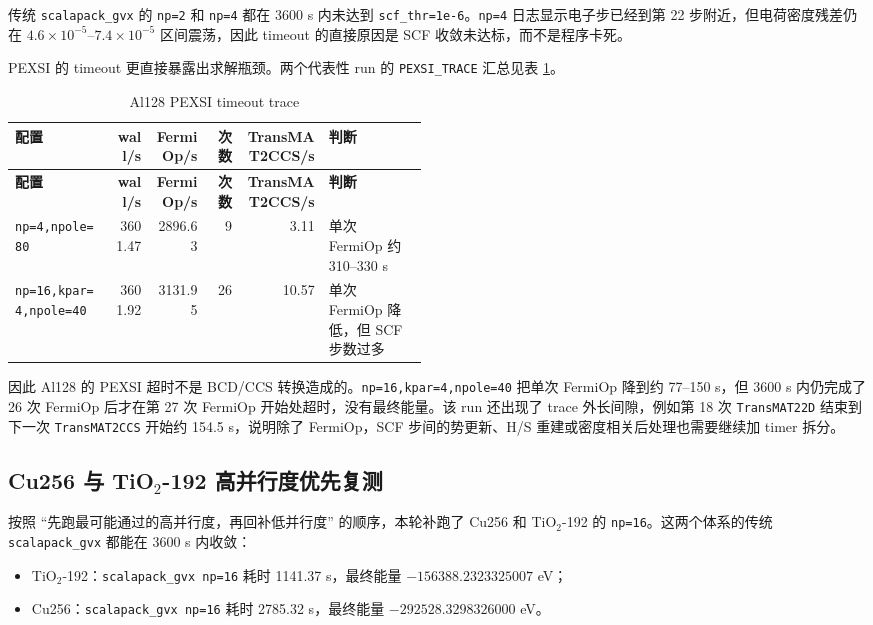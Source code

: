 \documentclass[a4paper,11pt]{article}
\newcommand{\code}[1]{\texttt{#1}}
\begin{document}
传统 \code{scalapack\_gvx} 的 \code{np=2} 和 \code{np=4} 都在 3600 s 内未达到 \code{scf\_thr=1e-6}。\code{np=4} 日志显示电子步已经到第 22 步附近，但电荷密度残差仍在 \(4.6\times10^{-5}\)--\(7.4\times10^{-5}\) 区间震荡，因此 timeout 的直接原因是 SCF 收敛未达标，而不是程序卡死。

PEXSI 的 timeout 更直接暴露出求解瓶颈。两个代表性 run 的 \code{PEXSI\_TRACE} 汇总见表 \ref{tab:al-trace}。

{\scriptsize
\begin{longtable}{@{}p{0.24\linewidth}r r r r p{0.24\linewidth}@{}}
\caption{Al128 PEXSI timeout trace}
\label{tab:al-trace}\\
\toprule
\textbf{配置} & \textbf{wall/s} & \textbf{FermiOp/s} & \textbf{次数} & \textbf{TransMAT2CCS/s} & \textbf{判断}\\
\midrule
\endfirsthead
\toprule
\textbf{配置} & \textbf{wall/s} & \textbf{FermiOp/s} & \textbf{次数} & \textbf{TransMAT2CCS/s} & \textbf{判断}\\
\midrule
\endhead
\code{np=4,npole=80} & 3601.47 & 2896.63 & 9 & 3.11 & 单次 FermiOp 约 310--330 s\\
\code{np=16,kpar=4,npole=40} & 3601.92 & 3131.95 & 26 & 10.57 & 单次 FermiOp 降低，但 SCF 步数过多\\
\bottomrule
\end{longtable}
}

因此 Al128 的 PEXSI 超时不是 BCD/CCS 转换造成的。\code{np=16,kpar=4,npole=40} 把单次 FermiOp 降到约 77--150 s，但 3600 s 内仍完成了 26 次 FermiOp 后才在第 27 次 FermiOp 开始处超时，没有最终能量。该 run 还出现了 trace 外长间隙，例如第 18 次 \code{TransMAT22D} 结束到下一次 \code{TransMAT2CCS} 开始约 154.5 s，说明除了 FermiOp，SCF 步间的势更新、H/S 重建或密度相关后处理也需要继续加 timer 拆分。

\subsection{Cu256 与 TiO\(_2\)-192 高并行度优先复测}

按照 ``先跑最可能通过的高并行度，再回补低并行度'' 的顺序，本轮补跑了 Cu256 和 TiO\(_2\)-192 的 \code{np=16}。这两个体系的传统 \code{scalapack\_gvx} 都能在 3600 s 内收敛：

\begin{itemize}
    \item TiO\(_2\)-192：\code{scalapack\_gvx np=16} 耗时 1141.37 s，最终能量 \(-156388.2323325007\) eV；
    \item Cu256：\code{scalapack\_gvx np=16} 耗时 2785.32 s，最终能量 \(-292528.3298326000\) eV。
\end{itemize}
\end{document}
